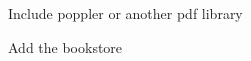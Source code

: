 
\begin{DoxyItemize}
\item Include poppler or another pdf library
\item Add the bookstore 
\end{DoxyItemize}
